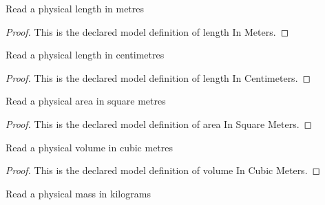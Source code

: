 \begin{definition}
  \label{def:physics:phyx-mini-0447:phyxminiproblems-problemphyxmini0447-lengthinmeters}
  Read a physical length in metres
\end{definition}
\begin{proof}
  This is the declared model definition of length In Meters.
\end{proof}
\begin{definition}
  \label{def:physics:phyx-mini-0447:phyxminiproblems-problemphyxmini0447-lengthincentimeters}
  Read a physical length in centimetres
\end{definition}
\begin{proof}
  This is the declared model definition of length In Centimeters.
\end{proof}
\begin{definition}
  \label{def:physics:phyx-mini-0447:phyxminiproblems-problemphyxmini0447-areainsquaremeters}
  Read a physical area in square metres
\end{definition}
\begin{proof}
  This is the declared model definition of area In Square Meters.
\end{proof}
\begin{definition}
  \label{def:physics:phyx-mini-0447:phyxminiproblems-problemphyxmini0447-volumeincubicmeters}
  Read a physical volume in cubic metres
\end{definition}
\begin{proof}
  This is the declared model definition of volume In Cubic Meters.
\end{proof}
\begin{definition}
  \label{def:physics:phyx-mini-0447:phyxminiproblems-problemphyxmini0447-massinkilograms}
  Read a physical mass in kilograms
\end{definition}
